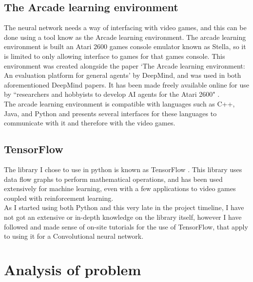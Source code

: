 \documentclass[10pt]{article}
\begin{document}
	\medskip
	
	\subsection{The Arcade learning environment}
	
		The neural network needs a way of interfacing with video games, and this can be done using a tool know as the Arcade learning environment. The arcade learning environment is built an Atari 2600 games console emulator known as Stella, so it is limited to only allowing interface to games for that games console. This environment was created alongside the paper `The Arcade learning environment: An evaluation platform for general agents' \cite{ale} by DeepMind, and was used in both aforementioned DeepMind papers. It has been made freely available online for use by ``researchers and hobbyists to develop AI agents for the Atari 2600" \cite{ale}.\\
		
		The arcade learning environment is compatible with languages such as C++, Java, and Python and presents several interfaces for these languages to communicate with it and therefore with the video games.
			
	\medskip
	
	\subsection{TensorFlow}
		The library I chose to use in python is known as TensorFlow \cite{tensor}. This library uses data flow graphs to perform mathematical operations, and has been used extensively for machine learning, even with a few applications to video games coupled with reinforcement learning.\\
		
		As I started using both Python and this very late in the project timeline, I have not got an extensive or in-depth knowledge on the library itself, however I have followed and made sense of on-site tutorials for the use of TensorFlow, that apply to using it for a Convolutional neural network.
	
	\bigskip

\section{Analysis of problem}
	
\end{document}

